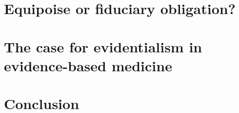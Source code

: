 \documentclass[letterpaper,notitlepage,12pt]{article}
\begin{document}
\section{Equipoise or fiduciary obligation?}

\section{The case for evidentialism in evidence-based medicine}

\section{Conclusion}
\end{document}
